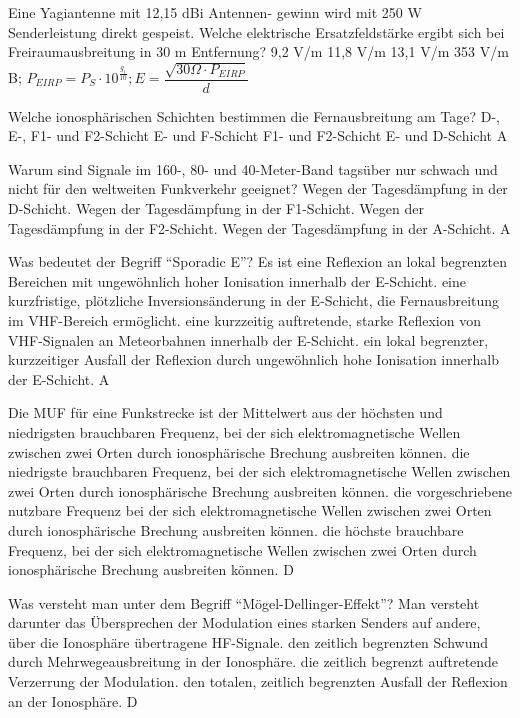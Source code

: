 {Eine Yagiantenne mit 12,15 dBi Antennen- gewinn wird mit 250 W Senderleistung direkt gespeist. Welche elektrische Ersatzfeldstärke ergibt sich bei Freiraumausbreitung in 30 m Entfernung?}%
{9,2 V/m}%
{11,8 V/m}%
{13,1 V/m}%
{353 V/m}%
{B; $P_{EIRP} = P_S \cdot 10^{\frac{g_i}{10}}; E=\dfrac{\sqrt{30\Omega \cdot P_{EIRP}}}{d}$}%

{Welche ionosphärischen Schichten bestimmen die Fernausbreitung am Tage?}%
{D-, E-, F1- und F2-Schicht}%
{E- und F-Schicht}%
{F1- und F2-Schicht}%
{E- und D-Schicht}%
{A}%

{ Warum sind Signale im 160-, 80- und 40-Meter-Band tagsüber nur schwach und nicht für den weltweiten Funkverkehr geeignet?}%
{Wegen der Tagesdämpfung in der D-Schicht.}%
{Wegen der Tagesdämpfung in der F1-Schicht.}%
{Wegen der Tagesdämpfung in der F2-Schicht.}%
{Wegen der Tagesdämpfung in der A-Schicht.}%
{A}%

{Was bedeutet der Begriff ``Sporadic E''? Es ist}%
{eine Reflexion an lokal begrenzten Bereichen mit ungewöhnlich hoher Ionisation innerhalb der E-Schicht.}%
{eine kurzfristige, plötzliche Inversionsänderung in der E-Schicht, die Fernausbreitung im VHF-Bereich ermöglicht.}%
{eine kurzzeitig auftretende, starke Reflexion von VHF-Signalen an Meteorbahnen innerhalb der E-Schicht.}%
{ein lokal begrenzter, kurzzeitiger Ausfall der Reflexion durch ungewöhnlich hohe Ionisation innerhalb der E-Schicht.}%
{A}%

{Die MUF für eine Funkstrecke ist}%
{der Mittelwert aus der höchsten und niedrigsten brauchbaren Frequenz, bei der sich elektromagnetische Wellen zwischen zwei Orten durch ionosphärische Brechung ausbreiten können.}%
{die niedrigste brauchbaren Frequenz, bei der sich elektromagnetische Wellen zwischen zwei Orten durch ionosphärische Brechung ausbreiten können.}%
{die vorgeschriebene nutzbare Frequenz bei der sich elektromagnetische Wellen zwischen zwei Orten durch ionosphärische Brechung ausbreiten können.}%
{die höchste brauchbare Frequenz, bei der sich elektromagnetische Wellen zwischen zwei Orten durch ionosphärische Brechung ausbreiten können.}%
{D}%

{Was versteht man unter dem Begriff ``Mögel-Dellinger-Effekt''? Man versteht darunter}%
{das Übersprechen der Modulation eines starken Senders auf andere, über die Ionosphäre übertragene HF-Signale.}%
{den zeitlich begrenzten Schwund durch Mehrwegeausbreitung in der Ionosphäre.}%
{die zeitlich begrenzt auftretende Verzerrung der Modulation.}%
{den totalen, zeitlich begrenzten Ausfall der Reflexion an der Ionosphäre.}%
{D}%
